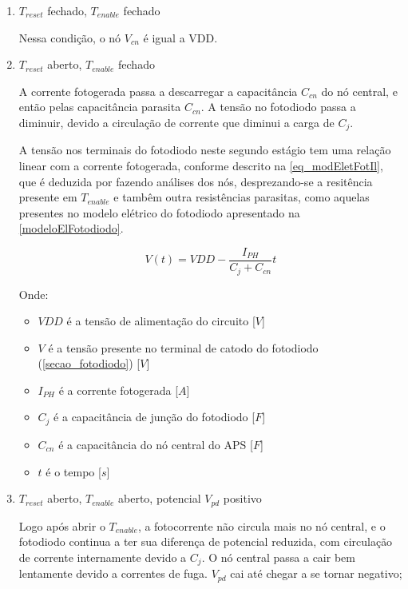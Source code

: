 \begin{enumerate}

\item \emph{$T_{reset}$} fechado, \emph{$T_{enable}$} fechado
    
Nessa condição, o n\'o $V_{cn}$ \'e igual a VDD.

\item \emph{$T_{reset}$} aberto, \emph{$T_{enable}$} fechado

A corrente fotogerada passa a descarregar a capacit\^ancia $C_{cn}$ do nó central, e então pelas capacitância parasita \emph{$C_{cn}$}. A tensão no fotodiodo passa a diminuir, devido a circulação de corrente que diminui a carga de \emph{$C_{j}$}.

A tens\~ao nos terminais do fotodiodo neste segundo est\'agio tem uma rela{\c c}\~ao linear com a corrente fotogerada, conforme descrito na \autoref{eq_modEletFotIl}, que \'e deduzida por fazendo an\'alises dos n\'os, desprezando-se a resitência presente em $T_{enable}$ e tamb\^em outra resistências parasitas, como aquelas presentes no modelo elétrico do fotodiodo apresentado na \autoref{modeloElFotodiodo}.

\begin{equation}
    \label{eq_modEletFotIl}
    V(t) = VDD-\frac{I_{PH}}{C_j+C_{cn}}t
\end{equation}

Onde:

\begin{itemize}
    \item $VDD$ \'e a tens\~ao de alimenta{\c c}\~ao do circuito [$V$]
    \item $V$ \'e a tens\~ao presente no terminal de catodo do fotodiodo (\autoref{secao_fotodiodo}) [$V$]
    \item $I_{PH}$ \'e a corrente fotogerada [$A$]
    \item $C_j$ \'e a capacit\^ancia de jun{\c c}\~ao do fotodiodo [$F$]
    \item $C_{cn}$ \'e a capacit\^ancia do n\'o central do APS [$F$]
    \item $t$ \'e o tempo [$s$]
\end{itemize}

\item \emph{$T_{reset}$} aberto, \emph{$T_{enable}$} aberto, potencial \emph{$V_{pd}$} positivo

Logo ap\'os abrir o $T_{enable}$, a fotocorrente n\~ao circula mais no n\'o central, e o fotodiodo continua a ter sua diferen{\c c}a de potencial reduzida, com circula{\c c}\~ao de corrente internamente devido a \emph{$C_j$}. O n\'o central passa a cair bem lentamente devido a correntes de fuga. \emph{$V_{pd}$} cai at\'e chegar a se tornar negativo;


\end{enumerate}
